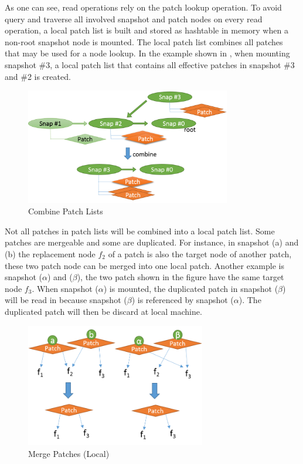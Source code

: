     As one can see, read operations rely on the patch lookup operation. To avoid query and traverse all involved snapshot and patch nodes on every read operation, a local patch list is built and stored as hashtable in memory when a non-root snapshot node is mounted. The local patch list combines all patches that may be used for a node lookup. In the example shown in , when mounting snapshot \#3, a local patch list that contains all effective patches in snapshot \#3 and \#2 is created.

\begin{figure}[hbtp]
\centering
\includegraphics[width=0.8\textwidth]{Chapter-4/figs/fig15.png}
\caption{Combine Patch Lists}
\label{fig:combine_patch_list}
\end{figure}

    Not all patches in patch lists will be combined into a local patch list. Some patches are mergeable and some are duplicated. For instance, in  snapshot (a) and (b) the replacement node $f_2$ of a patch is also the target node of another patch, these two patch node can be merged into one local patch. Another example is snapshot ($\alpha$) and ($\beta$), the two patch shown in the figure have the same target node $f_3$. When snapshot ($\alpha$) is mounted, the duplicated patch in snapshot ($\beta$) will be read in because snapshot ($\beta$) is referenced by snapshot ($\alpha$). The duplicated patch will then be discard at local machine.

\begin{figure}[hbtp]
\centering
\includegraphics[width=0.7\textwidth]{Chapter-4/figs/fig19.png}
\caption{Merge Patches (Local)}
\label{fig:merge}
\end{figure}

